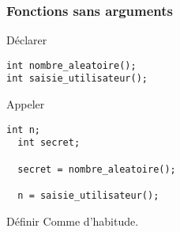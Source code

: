 \documentclass[xcolor=pdftex,svgnames,table]{beamer}
\begin{document}
\begin{frame}[fragile]
  \frametitle{Fonctions sans arguments}

 \begin{block}{Déclarer}
    \begin{lstlisting}[basicstyle=\ttfamily\small] 
int nombre_aleatoire();
int saisie_utilisateur();
     \end{lstlisting}
  \end{block}

  \begin{block}{Appeler}
  \begin{lstlisting}[basicstyle=\ttfamily\small] 
  int n;
  int secret;

  secret = nombre_aleatoire();

  n = saisie_utilisateur();
   \end{lstlisting}  
  \end{block}

  \begin{block}{Définir}
Comme d'habitude.
\end{block}
\end{frame}


\end{document}
